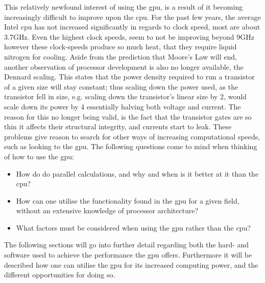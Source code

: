 This relatively newfound interest of using the \acrshort{gpu}, is a result of it becoming increasingly difficult to improve upon the \acrshort{cpu}. 
For the past few years, the average Intel \acrshort{cpu} has not increased significantly in regards to clock speed, most are about 3.7GHz.
Even the highest clock speeds, seem to not be improving beyond 9GHz however these clock-speeds produce so much heat, that they require liquid nitrogen for cooling.
Aside from the prediction that Moore's Law will end, another observation of processor development is also no longer available, the Dennard scaling.
This states that the power density required to run a transistor of a given size will stay constant; thus scaling down the power used, as the transistor fell in size, e.g. scaling down the transistor's linear size by 2, would scale down its power by 4 essentially halving both voltage and current.\citep{DennardScaling}
The reason for this no longer being valid, is the fact that the transistor gates are so thin it affects their structural integrity, and currents start to leak.\citep{CPUClockSpeeds}
These problems give reason to search for other ways of increasing computational speeds, such as looking to the \acrshort{gpu}.
The following questions come to mind when thinking of how to use the \acrshort{gpu}:


\begin{itemize}
	\item How do  do parallel calculations, and why and when is it better at it than the \acrshort{cpu}?
	\item How can one utilise the functionality found in the \acrshort{gpu} for a given field, without an extensive knowledge of processor architecture?
	\item What factors must be considered when using the \acrshort{gpu} rather than the \acrshort{cpu}? 
\end{itemize}

The following sections will go into further detail regarding both the hard- and software used to achieve the performance the \acrshort{gpu} offers.
Furthermore it will be described how one can utilise the \acrshort{gpu} for its increased computing power, and the different opportunities for doing so. 

\newpage


